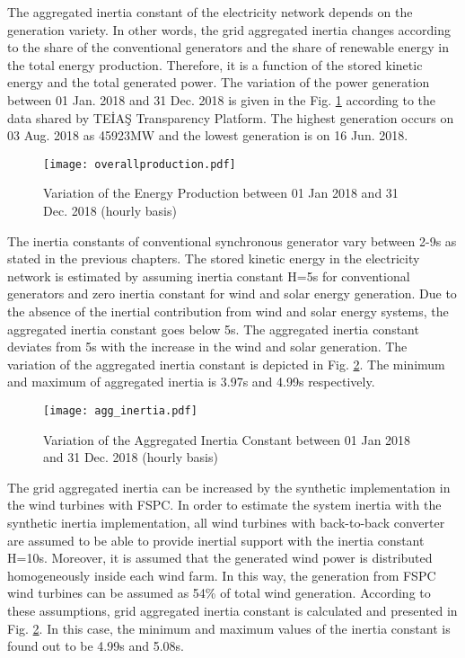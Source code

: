 The aggregated inertia constant of the electricity network depends on the generation variety. In other words, the grid aggregated inertia changes according to the share of the conventional generators and the share of renewable energy in the total energy production. Therefore, it is a function of the stored kinetic energy and the total generated power. The variation of the power generation between 01 Jan. 2018 and 31 Dec. 2018 is given in the Fig. \ref{overallprod} according to the data shared by TEİAŞ Transparency Platform. The highest generation occurs on 03 Aug. 2018 as 45923MW and the lowest generation is on 16 Jun. 2018. \par
\begin{figure}[h!]
	\centering
	\texttt{[image: overallproduction.pdf]}
	\caption{Variation of the Energy Production between 01 Jan 2018 and 31 Dec. 2018 (hourly basis)}
	\label{overallprod}
\end{figure}
The  inertia constants of conventional synchronous generator vary between 2-9s \cite{Kundur} as stated in the previous chapters. The stored kinetic energy in the electricity network is estimated by assuming inertia constant H=5s for conventional generators and zero inertia constant for wind and solar energy generation. Due to the absence of the inertial contribution from wind and solar energy systems, the aggregated inertia constant goes below 5s. The aggregated inertia constant deviates from 5s with the increase in the wind and solar generation. The variation of the aggregated inertia constant is depicted in Fig. \ref{overallinertia}. The minimum and maximum of aggregated inertia is 3.97s and 4.99s respectively.\par
\begin{figure}[h!]
	\centering
	\texttt{[image: agg\_inertia.pdf]}
	\caption{Variation of the Aggregated Inertia Constant between 01 Jan 2018 and 31 Dec. 2018 (hourly basis)}
	\label{overallinertia}
\end{figure}
The grid aggregated inertia can be increased by the synthetic implementation in the wind turbines with FSPC. In order to estimate the system inertia with the synthetic inertia implementation, all wind turbines with back-to-back converter are assumed to be able to provide inertial support with the inertia constant H=10s. Moreover, it is assumed that the generated wind power is distributed homogeneously inside each wind farm. In this way, the generation from FSPC wind turbines can be assumed as 54\% of total wind generation. According to these assumptions, grid aggregated inertia constant is calculated and presented in Fig. \ref{overallinertia}. In this case, the minimum and maximum values of the inertia constant is found out to be 4.99s and 5.08s. \par
